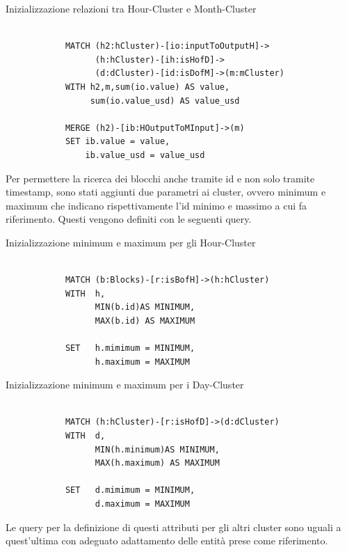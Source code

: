 \vspace{3mm}
\begin{center}
Inizializzazione relazioni tra Hour-Cluster e Month-Cluster
\begin{lstlisting}

            MATCH (h2:hCluster)-[io:inputToOutputH]->
                  (h:hCluster)-[ih:isHofD]->
                  (d:dCluster)-[id:isDofM]->(m:mCluster)
            WITH h2,m,sum(io.value) AS value, 
                 sum(io.value_usd) AS value_usd

            MERGE (h2)-[ib:HOutputToMInput]->(m) 
            SET ib.value = value, 
                ib.value_usd = value_usd
\end{lstlisting} 
\end{center}
\newpage \thispagestyle{mystyle}
Per permettere la ricerca dei blocchi anche tramite id e non solo tramite timestamp, sono stati aggiunti due parametri ai cluster, ovvero minimum e maximum che indicano rispettivamente l'id minimo e massimo a cui fa riferimento.
Questi vengono definiti con le seguenti query.

\vspace{3mm}
\begin{center}
Inizializzazione minimum e maximum per gli Hour-Cluster
\begin{lstlisting}

            MATCH (b:Blocks)-[r:isBofH]->(h:hCluster)
            WITH  h,
                  MIN(b.id)AS MINIMUM,
                  MAX(b.id) AS MAXIMUM
                  
            SET   h.mimimum = MINIMUM,
                  h.maximum = MAXIMUM
\end{lstlisting} 
\end{center}

\vspace{3mm}
\begin{center}
Inizializzazione minimum e maximum per i Day-Cluster
\begin{lstlisting}

            MATCH (h:hCluster)-[r:isHofD]->(d:dCluster)
            WITH  d,
                  MIN(h.minimum)AS MINIMUM,
                  MAX(h.maximum) AS MAXIMUM
                  
            SET   d.mimimum = MINIMUM,
                  d.maximum = MAXIMUM
\end{lstlisting} 
\end{center}

Le query per la definizione di questi attributi per gli altri cluster sono uguali a quest'ultima con adeguato adattamento delle entità prese come riferimento.


